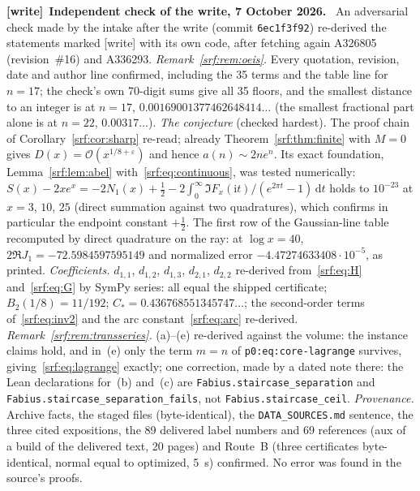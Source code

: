 \documentclass[11pt]{article}
\theoremstyle{remark}\newtheorem{remark}[theorem]{Remark}
\newcommand{\eps}{\varepsilon}
\newcommand{\OO}{\mathcal O}
\newcommand{\ii}{\mathrm i}
\newcommand{\dd}{\,\mathrm d}
\newcommand{\file}[1]{\nolinkurl{#1}}
\newenvironment{writenote}[1][]{\par\smallskip\begingroup\small
 \noindent\textbf{[write]}\if\relax\detokenize{#1}\relax\else~\textbf{#1.}\fi\ }%
 {\par\endgroup\smallskip}
\begin{document}
\begin{writenote}[Independent check of the write, 7 October 2026]
An adversarial check made by the intake after the write (commit
\file{6ec1f3f92}) re-derived the statements marked [write] with its own code,
after fetching again A326805 (revision~\#16) and A336293.
\emph{Remark~\ref{srf:rem:oeis}.} Every quotation, revision, date and author
line confirmed, including the 35 terms and the table line for $n=17$; the
check's own 70-digit sums give all 35 floors, and the smallest distance to an
integer is at $n=17$, $0.00169001377462648414\ldots$ (the smallest fractional
part alone is at $n=22$, $0.00317\ldots$). \emph{The conjecture} (checked
hardest). The proof chain of Corollary~\ref{srf:cor:sharp} re-read; already
Theorem~\ref{srf:thm:finite} with $M=0$ gives $D(x)=\OO(x^{1/8+\eps})$ and
hence $a(n)\sim2ne^n$. Its exact foundation, Lemma~\ref{srf:lem:abel}
with~\eqref{srf:eq:continuous}, was tested numerically:
$S(x)-2xe^x=-2N_1(x)+\tfrac12-2\int_0^\infty\Im F_x(\ii t)/(e^{2\pi t}-1)\dd t$
holds to $10^{-23}$ at $x=3$, $10$, $25$ (direct summation against two
quadratures), which confirms in particular the endpoint constant $+\tfrac12$.
The first row of the Gaussian-line table recomputed by direct quadrature on
the ray: at $\log x=40$, $2\Re J_1=-72.5984597595149$ and normalized error
$-4.47274633408\cdot10^{-5}$, as printed. \emph{Coefficients.} $d_{1,1}$,
$d_{1,2}$, $d_{1,3}$, $d_{2,1}$, $d_{2,2}$ re-derived from~\eqref{srf:eq:H}
and~\eqref{srf:eq:G} by SymPy series: all equal the shipped certificate;
$B_2(1/8)=11/192$; $C_*=0.436768551345747\ldots$; the second-order terms
of~\eqref{srf:eq:inv2} and the arc constant~\eqref{srf:eq:arc} re-derived.
\emph{Remark~\ref{srf:rem:transseries}.} (a)--(e) re-derived against the
volume: the instance claims hold, and in~(e) only the term $m=n$ of
\file{p0:eq:core-lagrange} survives, giving~\eqref{srf:eq:lagrange} exactly;
one correction, made by a dated note there: the Lean declarations for~(b)
and~(c) are \file{Fabius.staircase_separation} and
\file{Fabius.staircase_separation_fails}, not \file{Fabius.staircase_ceil}.
\emph{Provenance.} Archive facts, the staged files (byte-identical), the
\file{DATA_SOURCES.md} sentence, the three cited expositions, the 89
delivered label numbers and 69 references (aux of a build of the delivered
text, 20 pages) and Route~B (three certificates byte-identical, normal equal
to optimized, 5~s) confirmed. No error was found in the source's proofs.
\end{writenote}
\end{document}
